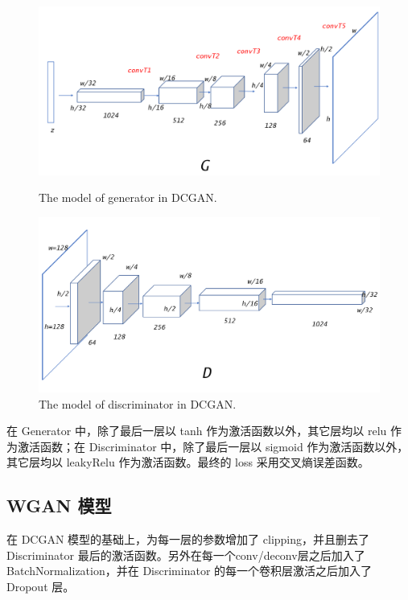 \documentclass{article}
\begin{document}
\begin{CJK*}{UTF8}{gbsn}
	\begin{figure}[htbp]
		\begin{minipage}{0.5\linewidth}
			\centering\includegraphics[scale=0.13]{res/DCGAN_generator.png}
			\caption{The model of generator in DCGAN.}
		\end{minipage}
		\begin{minipage}{0.5\linewidth}
			\centering\includegraphics[scale=0.13]{res/DCGAN_discriminator.png}
			\caption{The model of discriminator in DCGAN.}
		\end{minipage}
	\end{figure}
	
	在 Generator 中，除了最后一层以 tanh 作为激活函数以外，其它层均以 relu 作为激活函数；在 Discriminator 中，除了最后一层以 sigmoid 作为激活函数以外，其它层均以 leakyRelu 作为激活函数。最终的 loss 采用交叉熵误差函数。
	
  
  \subsection{WGAN 模型}

	在 DCGAN 模型的基础上，为每一层的参数增加了 clipping，并且删去了 Discriminator 最后的激活函数。另外在每一个conv/deconv层之后加入了 BatchNormalization，并在 Discriminator 的每一个卷积层激活之后加入了 Dropout 层。


\end{CJK*}
\end{document}
